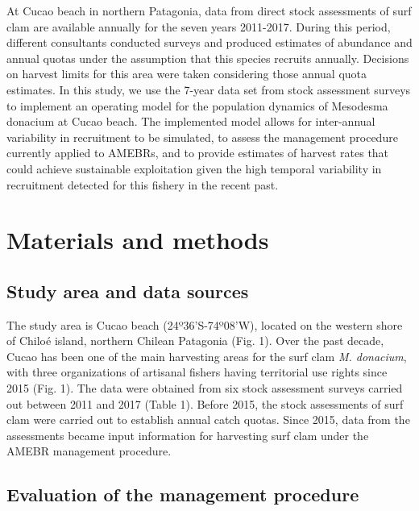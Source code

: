 \documentclass[12pt]{article}
\begin{document}
At Cucao beach in northern Patagonia, data from direct stock assessments
of surf clam are available annually for the seven years 2011-2017.
During this period, different consultants conducted surveys and produced
estimates of abundance and annual quotas under the assumption that this
species recruits annually. Decisions on harvest limits for this area
were taken considering those annual quota estimates. In this study, we
use the 7-year data set from stock assessment surveys to implement an
operating model for the population dynamics of Mesodesma donacium at
Cucao beach. The implemented model allows for inter-annual variability
in recruitment to be simulated, to assess the management procedure
currently applied to AMEBRs, and to provide estimates of harvest rates
that could achieve sustainable exploitation given the high temporal
variability in recruitment detected for this fishery in the recent past.

\FloatBarrier

\hypertarget{materials-and-methods}{%
\section{Materials and methods}\label{materials-and-methods}}

\hypertarget{study-area-and-data-sources}{%
\subsection{Study area and data
sources}\label{study-area-and-data-sources}}

The study area is Cucao beach (24º36'S-74º08'W), located on the western
shore of Chiloé island, northern Chilean Patagonia (Fig. 1). Over the
past decade, Cucao has been one of the main harvesting areas for the
surf clam \emph{M. donacium}, with three organizations of artisanal
fishers having territorial use rights since 2015 (Fig. 1). The data were
obtained from six stock assessment surveys carried out between 2011 and
2017 (Table 1). Before 2015, the stock assessments of surf clam were
carried out to establish annual catch quotas. Since 2015, data from the
assessments became input information for harvesting surf clam under the
AMEBR management procedure.

\hypertarget{evaluation-of-the-management-procedure}{%
\subsection{Evaluation of the management
procedure}\label{evaluation-of-the-management-procedure}}
\end{document}

